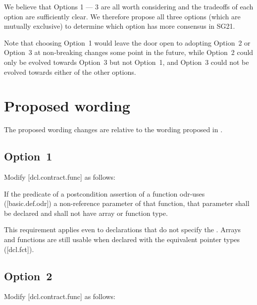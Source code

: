 We believe that Options 1 --- 3 are all worth considering and the tradeoffs of each option are sufficiently clear. We therefore propose all three options (which are mutually exclusive) to determine which option has more consensus in SG21. 

Note that choosing Option~1 would leave the door open to adopting Option~2 or Option~3 at non-breaking changes some point in the future, while Option~2 could only be evolved towards Option~3 but not Option~1, and Option~3 could not be evolved towards either of the other options.

\section{Proposed wording}

The proposed wording changes are relative to the wording proposed in \cite{P2900R10}.

\subsection*{Option~1}

Modify [dcl.contract.func] as follows:

\begin{adjustwidth}{0.5cm}{0.5cm}
If the predicate of a postcondition assertion of a function odr-uses ([basic.def.odr]) a
non-reference parameter of that function, that parameter shall be declared  and shall not have array or function type.
\begin{note}
This requirement applies even to declarations
that do not specify the . Arrays and functions are still usable when declared with the equivalent pointer types ([dcl.fct]).
\end{note}
\begin{example}
\tcode{[...]}
\end{example}
\end{adjustwidth}

\subsection*{Option~2}

Modify [dcl.contract.func] as follows:

